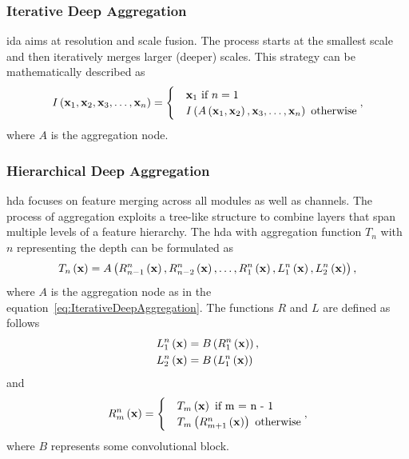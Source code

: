 \subsubsection{Iterative Deep Aggregation}

\gls{ida} aims at resolution and scale fusion. The process starts at the smallest scale and then iteratively merges larger (deeper) scales. This strategy can be mathematically described as
\begin{equation}
    \label{eq:IterativeDeepAggregation}
    {I} \left( \mathbf{x}_1, \mathbf{x}_2, \mathbf{x}_3, \dots, \mathbf{x}_n \right) =
    \begin{cases}
         & \mathbf{x}_1 \text{ if } n = 1                                                                \\
         & {I} \left( {A} \left( \mathbf{x}_1, \mathbf{x}_2 \right), \mathbf{x}_3, \dots, \mathbf{x}_n \right) \text{ otherwise}
    \end{cases},
\end{equation}
where $A$ is the aggregation node.

\subsubsection{Hierarchical Deep Aggregation}

\gls{hda} focuses on feature merging across all modules as well as channels. The process of aggregation exploits a tree-like structure to combine layers that span multiple levels of a feature hierarchy. The \gls{hda} with aggregation function $T_n$ with $n$ representing the depth can be formulated as
\begin{equation}
    \label{eq:HierarchicalDeepAggregation}
    {T_n} \left( \mathbf{x} \right) =
    {A} \left( 
        {{R}_{n - 1}^{n}} \left( \mathbf{x} \right),
        {{R}_{n - 2}^{n}} \left( \mathbf{x} \right),
        \dots,
        {{R}_{1}^{n}} \left( \mathbf{x} \right),
        {{L}_{1}^{n}} \left( \mathbf{x} \right),
        {{L}_{2}^{n}} \left( \mathbf{x} \right)
     \right),
\end{equation}
where $A$ is the aggregation node as in the equation~\ref{eq:IterativeDeepAggregation}. The functions $R$ and $L$ are defined as follows
\begin{equation}
    \label{eq:HDAConvBlocksL}
    \begin{aligned}
         & {{L}_{1}^{n}} \left( \mathbf{x} \right) = {B} \left( {{R}_{1}^{n}} \left( \mathbf{x} \right) \right), \\
         & {{L}_{2}^{n}} \left( \mathbf{x} \right) = {B} \left( {{L}_{1}^{n}} \left( \mathbf{x} \right) \right)
    \end{aligned}
\end{equation}
and
\begin{equation}
    \label{eq:DLAConvBlocksR}
    \func{\subsup{R}{m}{n}}{\vect{x}} =
    \begin{cases}
         & \func{T_m}{\vect{x}} \text{ if } $m = n - 1$                        \\
         & \func{T_m}{\func{\subsup{R}{m + 1}{n}}{\vect{x}}} \text{ otherwise}
    \end{cases},
\end{equation}
where $B$ represents some convolutional block.

